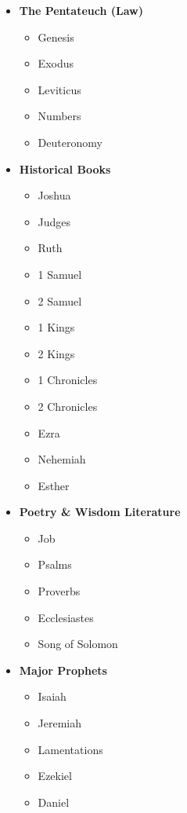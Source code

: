 \begin{multicols}{3}
\begin{itemize}
	\item \textbf{The Pentateuch (Law)}
	\begin{itemize}
		\item Genesis
		\item Exodus
		\item Leviticus
		\item Numbers
		\item Deuteronomy
	\end{itemize}
	
	\item \textbf{Historical Books}
	\begin{itemize}
		\item Joshua
		\item Judges
		\item Ruth
		\item 1 Samuel
		\item 2 Samuel
		\item 1 Kings
		\item 2 Kings
		\item 1 Chronicles
		\item 2 Chronicles
		\item Ezra
		\item Nehemiah
		\item Esther
	\end{itemize}
	
	\item \textbf{Poetry \& Wisdom Literature}
	\begin{itemize}
		\item Job
		\item Psalms
		\item Proverbs
		\item Ecclesiastes
		\item Song of Solomon
	\end{itemize}
	
	\item \textbf{Major Prophets}
	\begin{itemize}
		\item Isaiah
		\item Jeremiah
		\item Lamentations
		\item Ezekiel
		\item Daniel
	\end{itemize}
	

\end{itemize}
\end{multicols}
